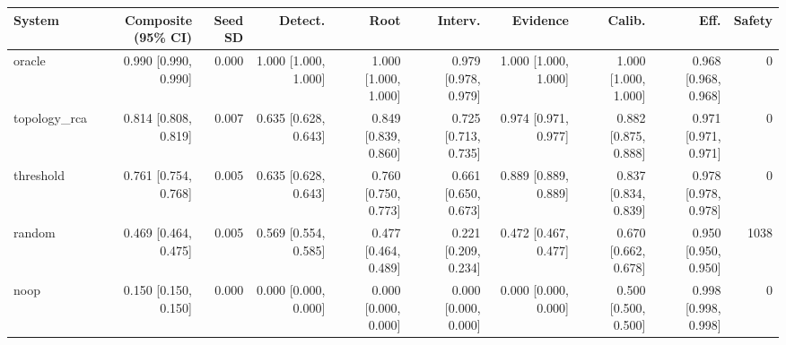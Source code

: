 \begin{tabular}{lrrrrrrrrr}
\toprule
System & Composite (95\% CI) & Seed SD & Detect. & Root & Interv. & Evidence & Calib. & Eff. & Safety \\
\midrule
oracle & 0.990 [0.990, 0.990] & 0.000 & 1.000 [1.000, 1.000] & 1.000 [1.000, 1.000] & 0.979 [0.978, 0.979] & 1.000 [1.000, 1.000] & 1.000 [1.000, 1.000] & 0.968 [0.968, 0.968] & 0 \\
topology\_rca & 0.814 [0.808, 0.819] & 0.007 & 0.635 [0.628, 0.643] & 0.849 [0.839, 0.860] & 0.725 [0.713, 0.735] & 0.974 [0.971, 0.977] & 0.882 [0.875, 0.888] & 0.971 [0.971, 0.971] & 0 \\
threshold & 0.761 [0.754, 0.768] & 0.005 & 0.635 [0.628, 0.643] & 0.760 [0.750, 0.773] & 0.661 [0.650, 0.673] & 0.889 [0.889, 0.889] & 0.837 [0.834, 0.839] & 0.978 [0.978, 0.978] & 0 \\
random & 0.469 [0.464, 0.475] & 0.005 & 0.569 [0.554, 0.585] & 0.477 [0.464, 0.489] & 0.221 [0.209, 0.234] & 0.472 [0.467, 0.477] & 0.670 [0.662, 0.678] & 0.950 [0.950, 0.950] & 1038 \\
noop & 0.150 [0.150, 0.150] & 0.000 & 0.000 [0.000, 0.000] & 0.000 [0.000, 0.000] & 0.000 [0.000, 0.000] & 0.000 [0.000, 0.000] & 0.500 [0.500, 0.500] & 0.998 [0.998, 0.998] & 0 \\
\bottomrule
\end{tabular}
